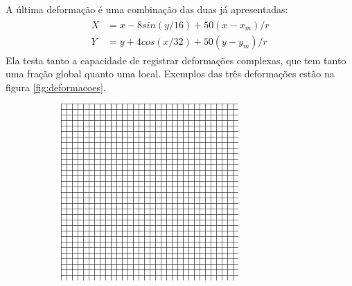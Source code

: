 	A última deformação é uma combinação das duas já apresentadas:
\begin{align} \label{math:composta}
\begin{split}
	X &= x-8sin(y/16) + 50(x-x_m)/r \\
	Y &= y+4cos(x/32) + 50(y-y_m)/r
\end{split} 
\end{align}
	Ela testa tanto a capacidade de registrar deformações complexas, que tem tanto uma fração global quanto uma local. 
Exemplos das três deformações estão na figura \ref{fig:deformacoes}.

\begin{figure}[H]
    \centering
	\begin{subfigure}[t]{0.3\textwidth}
	  \includegraphics[width=\textwidth]{figuras/grid.png}
	  \label{fig:ref-image}
	\end{subfigure}
	\begin{subfigure}[t]{0.3\textwidth}

\end{subfigure}
\end{figure}
